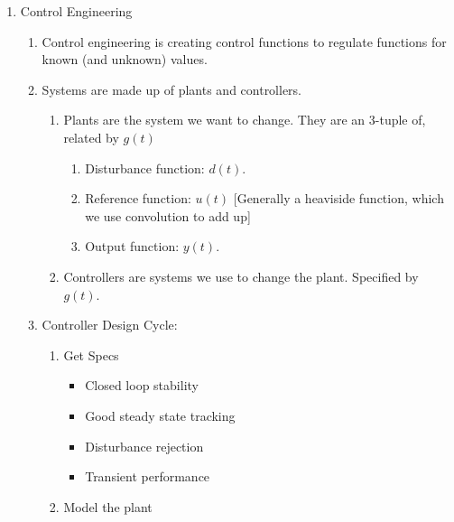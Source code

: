 \begin{enumerate}
    \item Control Engineering
        \begin{enumerate}
            \item Control engineering is creating control functions to regulate functions for known (and unknown) values.
            \item Systems are made up of plants and controllers.

                \begin{enumerate}
                    \item Plants are the system we want to change. They are an 3-tuple of, related by $g(t)$

                    \begin{enumerate}
                        \item Disturbance function: $d(t)$.
                        \item Reference function: $u(t)$ [Generally a heaviside function, which we use convolution to add up]
                        \item Output function: $y(t)$.
                    \end{enumerate}

                    \item Controllers are systems we use to change the plant. Specified by $g(t)$.
                \end{enumerate}
            \item Controller Design Cycle:
                \begin{enumerate}
                    \item Get Specs

                    \begin{itemize}
                        \item Closed loop stability

                        \item Good steady state tracking

                        \item Disturbance rejection

                        \item Transient performance
                    \end{itemize}

                    \item Model the plant


\end{enumerate}
\end{enumerate}
\end{enumerate}
